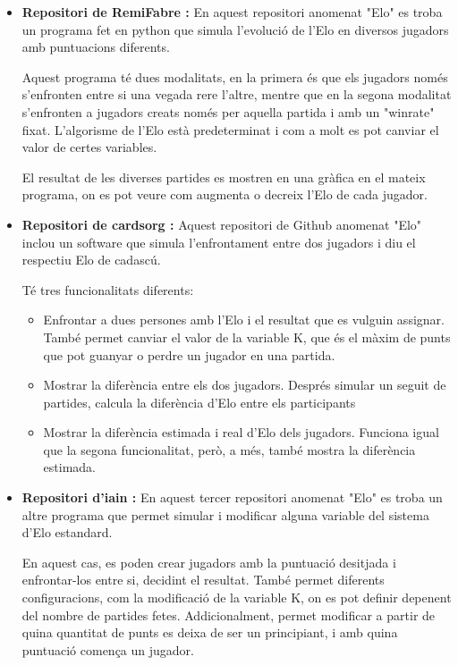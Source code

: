 \documentclass[a4paper]{article}
\begin{document}
\begin{itemize}
    \item \textbf{Repositori de RemiFabre \cite{EloSystemRemi}:} En aquest repositori anomenat "Elo" \space es troba un programa fet en python que simula l'evolució de l'Elo en diversos jugadors amb puntuacions diferents.
    
    Aquest programa té dues modalitats, en la primera és que els jugadors només s'enfronten entre si una vegada rere l'altre, mentre que en la segona modalitat s'enfronten a jugadors creats només per aquella partida i amb un "winrate" \space fixat. L'algorisme de l'Elo està predeterminat i com a molt es pot canviar el valor de certes variables.
    
    El resultat de les diverses partides es mostren en una gràfica en el mateix programa, on es pot veure com augmenta o decreix l'Elo de cada jugador. 
    
    \item \textbf{Repositori de cardsorg \cite{EloSystemCardsorg}:} Aquest repositori de Github anomenat "Elo" \space inclou un software que simula l'enfrontament entre dos jugadors i diu el respectiu Elo de cadascú. 
    
    Té tres funcionalitats diferents:
    \begin{itemize}
        \item Enfrontar a dues persones amb l'Elo i el resultat que es vulguin assignar. També permet canviar el valor de la variable K, que és el màxim de punts que pot guanyar o perdre un jugador en una partida.
        
        \item  Mostrar la diferència entre els dos jugadors. Després simular un seguit de partides, calcula la diferència d'Elo entre els participants
        
        \item Mostrar la diferència estimada i real d'Elo dels jugadors. Funciona igual que la segona funcionalitat, però, a més, també mostra la diferència estimada.
    \end{itemize}
    
    \item \textbf{Repositori d'iain \cite{EloSystemiain}:} En aquest tercer repositori anomenat "Elo" \space es troba un altre programa que permet simular i modificar alguna variable del sistema d'Elo estandard. 
    
    En aquest cas, es poden crear jugadors amb la puntuació desitjada i enfrontar-los entre si, decidint el resultat. També permet diferents configuracions, com la modificació de la variable K, on es pot definir depenent del nombre de partides fetes. Addicionalment, permet modificar a partir de quina quantitat de punts es deixa de ser un principiant, i amb quina puntuació comença un jugador.
    

\end{itemize}
\end{document}
